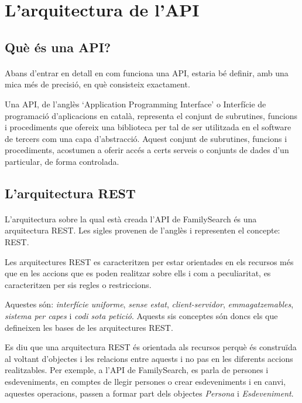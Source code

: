 \section{L'arquitectura de l'\gls{API}}


    \subsection{Què és una \gls{API}?}

    \paragraph{}
    Abans d'entrar en detall en com funciona una \gls{API}, estaria bé definir, amb una mica més de precisió, en què consisteix exactament.

    Una \gls{API}, de l'anglès `Application Programming Interface' o Interfície de programació d'aplicacions en català, representa el conjunt de subrutines, funcions i procediments que ofereix una biblioteca per tal de ser utilitzada en el software de tercers com una capa d'abstracció. Aquest conjunt de subrutines, funcions i procediments, acostumen a oferir accés a certs serveis o conjunts de dades d'un particular, de forma controlada.


    \subsection{L'arquitectura REST}

    \paragraph{}
    L’arquitectura sobre la qual està creada l’\gls{API} de FamilySearch és una arquitectura REST. Les sigles provenen de l’anglès i representen el concepte: \gls{REST}.

    Les arquitectures \gls{REST} es caracteritzen per estar orientades en els recursos més que en les accions que es poden realitzar sobre ells i com a peculiaritat, es caracteritzen per sis regles o restriccions.

    Aquestes són: \emph{interfície uniforme}, \emph{sense estat}, \emph{client-servidor}, \emph{emmagatzemables}, \emph{sistema per capes} i \emph{codi sota petició}. Aquests sis conceptes són doncs els que defineixen les bases de les arquitectures \gls{REST}.

    Es diu que una arquitectura \gls{REST} és orientada als recursos perquè és cons\-tru\-ï\-da al voltant d’objectes i les relacions entre aquests i no pas en les diferents accions realitzables. Per exemple, a l’\gls{API} de FamilySearch, es parla de persones i esdeveniments, en comptes de llegir persones o crear esdeveniments i en canvi, aquestes operacions, passen a formar part dels objectes \emph{Persona} i \emph{Esdeveniment}.

